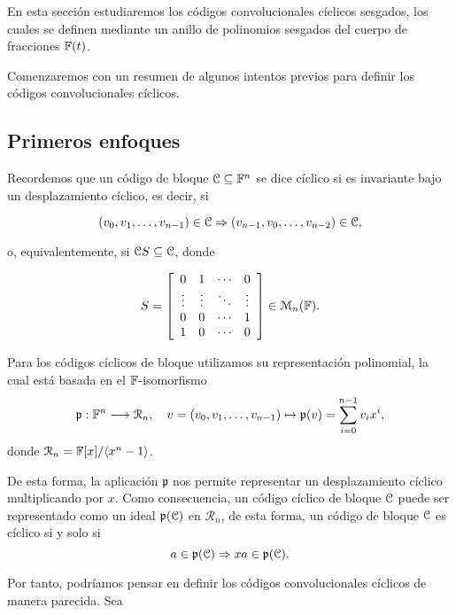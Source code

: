 En esta sección estudiaremos los códigos convolucionales cíclicos sesgados, los cuales se definen mediante un anillo de polinomios sesgados del cuerpo de fracciones $\mathbb{F}(t)$.

Comenzaremos con un resumen de algunos intentos previos para definir los códigos convolucionales cíclicos.

\subsection{Primeros enfoques}

Recordemos que un código de bloque $\mathcal C \subseteq \mathbb{F}^n$ se dice cíclico si es invariante bajo un desplazamiento cíclico, es decir, si 

\begin{equation}\label{eq:inv} (v_0,v_1,\dots,v_{n-1}) \in \mathcal C \Rightarrow (v_{n-1},v_0,\dots,v_{n-2}) \in \mathcal C,\end{equation}

o, equivalentemente, si $\mathcal C S \subseteq \mathcal C$, donde 

\begin{equation}\label{eq:matrixS} S = \left[ \begin{array}{cccc}
    0 & 1 & \cdots & 0 \\
    \vdots & \vdots & \ddots & \vdots \\
    0 & 0 & \cdots & 1 \\
    1 & 0 & \cdots & 0 \\
\end{array} \right] \in \mathcal{M}_{n}(\mathbb{F}).\end{equation}

Para los códigos cíclicos de bloque utilizamos su representación polinomial, la cual está basada en el $\mathbb{F}$-isomorfismo
$$\mathfrak{p}: \mathbb{F}^n \longrightarrow \mathcal{R}_n, \quad v = (v_0,v_1,\dots,v_{n-1}) \mapsto \mathfrak{p}(v) = \sum_{i=0}^{n-1}v_ix^i,$$
donde $\mathcal{R}_n = \mathbb{F}[x]/\langle x^n - 1 \rangle$.

De esta forma, la aplicación $\mathfrak{p}$ nos permite representar un desplazamiento cíclico multiplicando por $x$. Como consecuencia, un código cíclico de bloque $\mathcal C$ puede ser representado como un ideal $\mathfrak{p}(\mathcal C)$ en $\mathcal{R}_n$, de esta forma, un código de bloque $\mathcal C$ es cíclico si y solo si $$a \in \mathfrak{p}(\mathcal C) \Rightarrow xa \in \mathfrak{p}(\mathcal C).$$

Por tanto, podríamos pensar en definir los códigos convolucionales cíclicos de manera parecida. Sea

